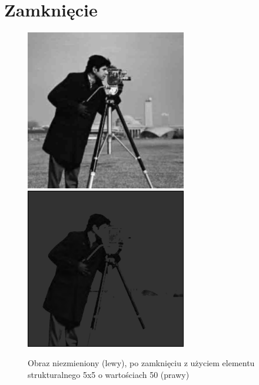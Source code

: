 \documentclass[a4paper,12pt]{book}
\begin{document}
\section{Zamknięcie}
\begin{figure}[H]
	\caption{Obraz niezmieniony (lewy), po zamknięciu z użyciem elementu strukturalnego 5x5 o wartościach 50 (prawy)}
	\includegraphics[width=7cm, height=7cm]{man-unmodified.jpg}
	\includegraphics[width=7cm, height=7cm]{morph-gray-closing-strel5x5-50.png}
\end{figure}
\end{document}
